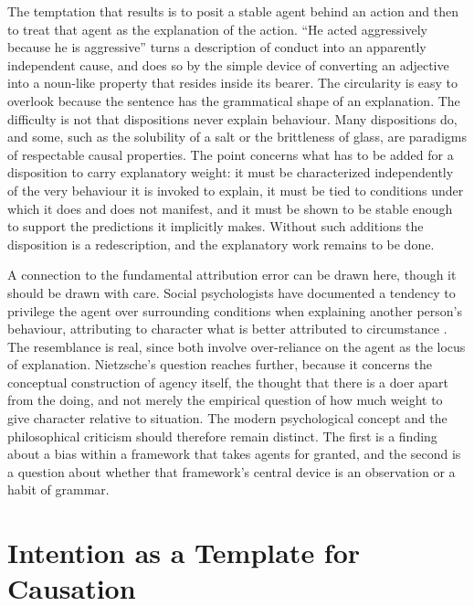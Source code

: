 \documentclass[11pt,letterpaper]{article}
\theoremstyle{definition}
\begin{document}
The temptation that results is to posit a stable agent behind an action and then to treat that agent as the explanation of the action. ``He acted aggressively because he is aggressive'' turns a description of conduct into an apparently independent cause, and does so by the simple device of converting an adjective into a noun-like property that resides inside its bearer. The circularity is easy to overlook because the sentence has the grammatical shape of an explanation. The difficulty is not that dispositions never explain behaviour. Many dispositions do, and some, such as the solubility of a salt or the brittleness of glass, are paradigms of respectable causal properties. The point concerns what has to be added for a disposition to carry explanatory weight: it must be characterized independently of the very behaviour it is invoked to explain, it must be tied to conditions under which it does and does not manifest, and it must be shown to be stable enough to support the predictions it implicitly makes. Without such additions the disposition is a redescription, and the explanatory work remains to be done.

A connection to the fundamental attribution error can be drawn here, though it should be drawn with care. Social psychologists have documented a tendency to privilege the agent over surrounding conditions when explaining another person's behaviour, attributing to character what is better attributed to circumstance \cite{ross1977}. The resemblance is real, since both involve over-reliance on the agent as the locus of explanation. Nietzsche's question reaches further, because it concerns the conceptual construction of agency itself, the thought that there is a doer apart from the doing, and not merely the empirical question of how much weight to give character relative to situation. The modern psychological concept and the philosophical criticism should therefore remain distinct. The first is a finding about a bias within a framework that takes agents for granted, and the second is a question about whether that framework's central device is an observation or a habit of grammar.

\section{Intention as a Template for Causation}
\end{document}
